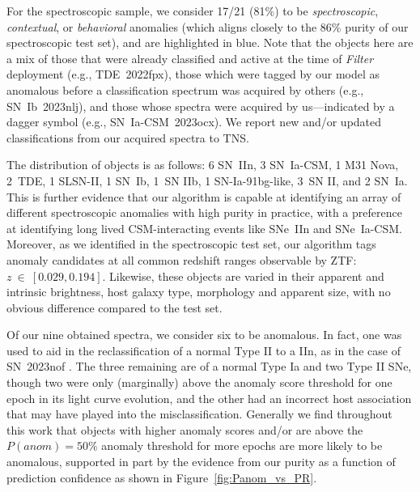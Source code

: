 \documentclass[twocolumn]{aastex63}
\begin{document}

For the spectroscopic sample, we consider 17/21 (81\%) to be \emph{spectroscopic}, \emph{contextual}, or \emph{behavioral} anomalies (which aligns closely to the 86\% purity of our spectroscopic test set), and are highlighted in blue. Note that the objects here are a mix of those that were already classified and active at the time of \emph{Filter} deployment (e.g., TDE~2022fpx), those which were tagged by our model as anomalous before a classification spectrum was acquired by others (e.g., SN~Ib~2023nlj), and those whose spectra were acquired by us---indicated by a dagger symbol (e.g., SN~Ia-CSM~2023ocx). We report new and/or updated classifications from our acquired spectra to TNS. \par

The distribution of objects is as follows: 6 SN~IIn, 3 SN~Ia-CSM, 1 M31 Nova, 2~TDE, 1 SLSN-II, 1 SN~Ib, 1~SN IIb, 1 SN-Ia-91bg-like, 3~SN II, and 2 SN~Ia. This is further evidence that our algorithm is capable at identifying an array of different spectroscopic anomalies with high purity in practice, with a preference at identifying long lived CSM-interacting events like SNe~IIn and SNe~Ia-CSM. Moreover, as we identified in the spectroscopic test set, our algorithm tags anomaly candidates at all common redshift ranges observable by ZTF: $z~\in~[0.029, 0.194]$. Likewise, these objects are varied in their apparent and intrinsic brightness, host galaxy type, morphology and apparent size, with no obvious difference compared to the test set. \par

Of our nine obtained spectra, we consider six to be anomalous. In fact, one was used to aid in the reclassification of a normal Type II to a IIn, as in the case of SN~2023nof \citep{Aleo2023nofTNS}. The three remaining are of a normal Type Ia and two Type II SNe, though two were only (marginally) above the anomaly score threshold for one epoch in its light curve evolution, and the other had an incorrect host association that may have played into the misclassification. Generally we find throughout this work that objects with higher anomaly scores and/or are above the $P(anom)=50\%$ anomaly threshold for more epochs are more likely to be anomalous, supported in part by the evidence from our purity as a function of prediction confidence as shown in Figure~\ref{fig:Panom_vs_PR}. \par
\end{document}
